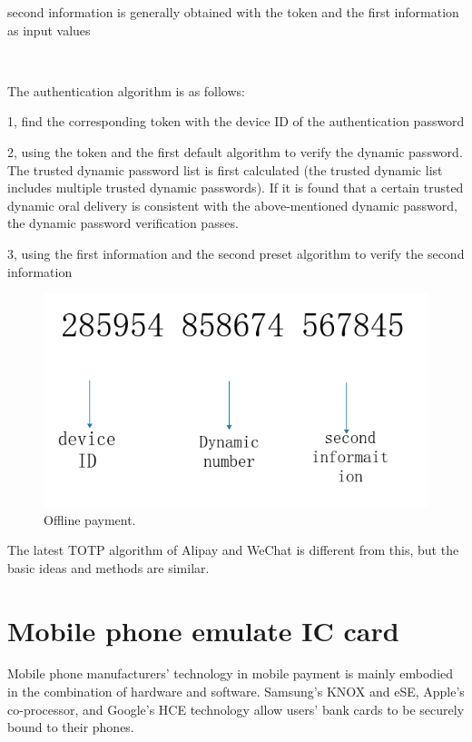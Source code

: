 \documentclass[journal]{IEEEtran}
\begin{document}
 second information is generally obtained with the token and the first information as input values

\

The authentication algorithm is as follows:

1, find the corresponding token with the device ID of the authentication password

2, using the token and the first default algorithm to verify the dynamic password.
The trusted dynamic password list is first calculated (the trusted dynamic list includes multiple trusted dynamic passwords).
If it is found that a certain trusted dynamic oral delivery is consistent with the above-mentioned dynamic password, the dynamic password verification passes.

3, using the first information and the second preset algorithm to verify the second information




\begin{figure}[htbp]
\centerline{\includegraphics[scale=0.4]{OTP.png}}
\caption{Offline payment.}
\label{fig}
\end{figure}

The latest TOTP algorithm of Alipay and WeChat is different from this, but the basic ideas and methods are similar.









\section{Mobile phone emulate IC card}
Mobile phone manufacturers’ technology in mobile payment is mainly embodied in the combination of hardware and software. Samsung’s KNOX and eSE, Apple’s co-processor, and Google’s HCE technology allow users’ bank cards to be securely bound to their phones.
\end{document}
